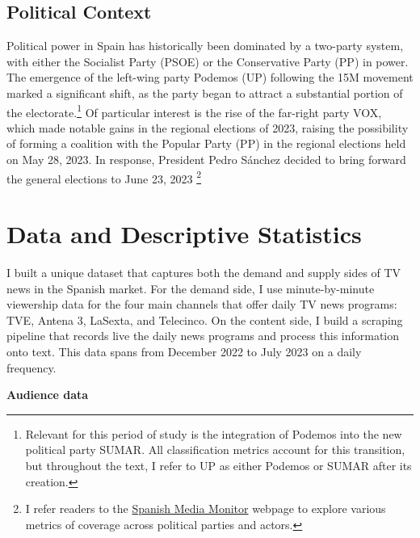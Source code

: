 \documentclass[12pt]{article}
\begin{document}
	

	
	
	
	
	\subsection*{Political Context}
	
	Political power in Spain has historically been dominated by a two-party system, with either the Socialist Party (PSOE) or the Conservative Party (PP) in power. The emergence of the left-wing party Podemos (UP) following the 15M movement marked a significant shift, as the party began to attract a substantial portion of the electorate.\footnote{Relevant for this period of study is the integration of Podemos into the new political party SUMAR. All classification metrics account for this transition, but throughout the text, I refer to UP as either Podemos or SUMAR after its creation.} Of particular interest is the rise of the far-right party VOX, which made notable gains in the regional elections of 2023, raising the possibility of forming a coalition with the Popular Party (PP) in the regional elections held on May 28, 2023. In response, President Pedro Sánchez decided to bring forward the general elections to June 23, 2023 \footnote{ I refer readers to the \href{https://luisignaciomenendez.github.io/media_monitor/index.html}{Spanish Media Monitor} webpage to explore various metrics of coverage across political parties and actors.} 
	
	
	
	

	

	\section{Data and Descriptive Statistics}
	
	\label{section:data}
	
	I built a unique dataset that captures both the demand and supply sides of TV news in the Spanish market. For the demand side, I use minute-by-minute viewership data for the four main channels that offer daily TV news programs: TVE, Antena 3, LaSexta, and Telecinco. On the content side, I build a scraping pipeline that records live the daily news programs and process this information onto text.  This data spans from December 2022 to July 2023 on a daily frequency. 
	
	
	
	\textbf{Audience data }
	
\end{document}
